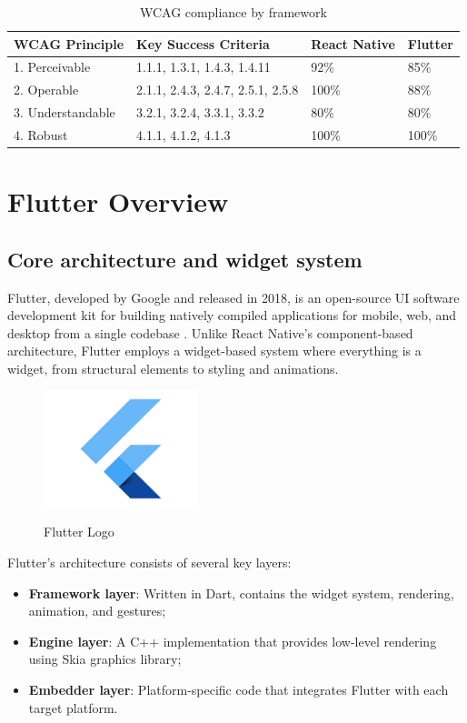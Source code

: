 \begin{table}[ht]
\caption{WCAG compliance by framework}
\label{tab:wcag_compliance_comparison}
\centering
\begin{tabular}{|p{2.5cm}|p{5cm}|p{3cm}|p{3cm}|}
\hline
\textbf{WCAG Principle} & \textbf{Key Success Criteria} & \textbf{React Native} & \textbf{Flutter} \\
\hline
1. Perceivable & 1.1.1, 1.3.1, 1.4.3, 1.4.11 & 92\% & 85\% \\
\hline
2. Operable & 2.1.1, 2.4.3, 2.4.7, 2.5.1, 2.5.8 & 100\% & 88\% \\
\hline
3. Understandable & 3.2.1, 3.2.4, 3.3.1, 3.3.2 & 80\% & 80\% \\
\hline
4. Robust & 4.1.1, 4.1.2, 4.1.3 & 100\% & 100\% \\
\hline
\end{tabular}
\end{table}

\pagebreak

\section{Flutter Overview}
\subsection{Core architecture and widget system}
Flutter, developed by Google and released in 2018, is an open-source UI software development kit for building natively compiled applications for mobile, web, and desktop from a single codebase \cite{site:flutter}. Unlike React Native's component-based architecture, Flutter employs a widget-based system where everything is a widget, from structural elements to styling and animations.

\begin{figure}[ht]
    \centering
    \includegraphics[width=0.4\textwidth, alt={Flutter Logo}]{img/flutter-logo.jpg}
    \caption{Flutter Logo}
\label{fig:flutter-logo}
\end{figure}

Flutter's architecture consists of several key layers:
\begin{itemize}
    \item \textbf{Framework layer}: Written in Dart, contains the widget system, rendering, animation, and gestures;
    \item \textbf{Engine layer}: A C++ implementation that provides low-level rendering using Skia graphics library;
    \item \textbf{Embedder layer}: Platform-specific code that integrates Flutter with each target platform.
\end{itemize}

